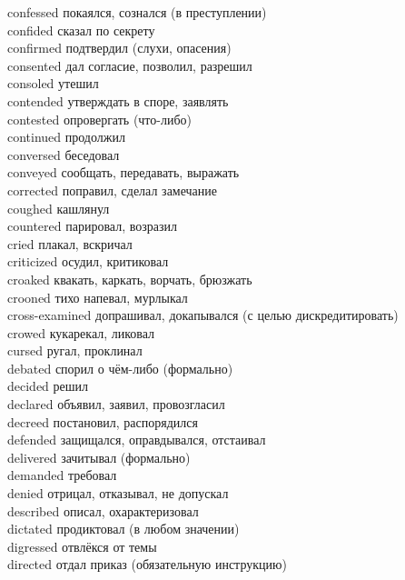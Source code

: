 \documentclass[a4paper,12pt,fleqn]{book}\usepackage{polyglossia}\setdefaultlanguage[babelshorthands=true]{russian}\setotherlanguage{english}\defaultfontfeatures{Ligatures=TeX,Mapping=tex-text}\usepackage{xcolor}\newcommand{\ml}[3]{#2}
\begin{document}
{confessed \hfill покаялся, сознался (в преступлении)\\
confided \hfill сказал по секрету\\
confirmed \hfill подтвердил (слухи, опасения)\\
consented \hfill дал согласие, позволил, разрешил\\
consoled \hfill утешил\\
contended \hfill утверждать в споре, заявлять\\
contested \hfill опровергать (что-либо)\\
continued \hfill продолжил\\
conversed \hfill беседовал\\
conveyed \hfill сообщать, передавать, выражать\\
corrected \hfill поправил, сделал замечание\\
coughed \hfill кашлянул\\
countered \hfill парировал, возразил\\
cried \hfill плакал, вскричал\\
criticized \hfill осудил, критиковал\\
croaked \hfill квакать, каркать, ворчать, брюзжать\\
crooned \hfill тихо напевал, мурлыкал\\
cross-examined \hfill допрашивал, докапывался (с целью дискредитировать)\\
crowed \hfill кукарекал, ликовал\\
cursed \hfill ругал, проклинал\\
debated \hfill спорил о чём-либо (формально)\\
decided \hfill решил\\
declared \hfill объявил, заявил, провозгласил\\
decreed \hfill постановил, распорядился\\
defended \hfill защищался, оправдывался, отстаивал\\
delivered \hfill зачитывал (формально)\\
demanded \hfill требовал\\
denied \hfill отрицал, отказывал, не допускал\\
described \hfill описал, охарактеризовал\\
dictated \hfill продиктовал (в любом значении)\\
digressed \hfill отвлёкся от темы\\
directed \hfill отдал приказ (обязательную инструкцию)\\
}
\end{document}
